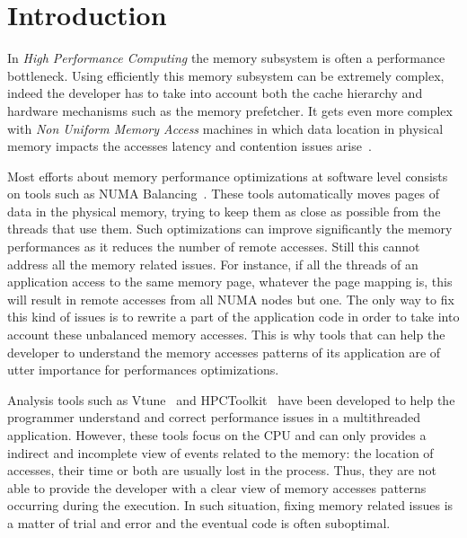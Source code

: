 \section{Introduction}
\label{sec:intro}

In \emph{High Performance Computing} the memory subsystem is often a performance bottleneck.
Using efficiently this memory subsystem can be extremely
complex, indeed the developer has to take into account both the cache hierarchy and
hardware mechanisms such as the memory prefetcher. It gets even more complex with
\emph{Non Uniform Memory Access} machines in which data location in
physical memory impacts the accesses latency and contention issues arise~\cite{Drepper07What}.

Most efforts about memory performance optimizations at software level consists
on tools such as NUMA Balancing~\cite{Corbet2012}.
These tools automatically moves pages of data in the physical memory, trying
to keep them as close as possible from the threads that use them. Such
optimizations can improve significantly the memory performances as it reduces
the number of remote accesses. Still this cannot address all the memory related issues. For instance, if all the
threads of an application access to the same memory page, whatever the page mapping is,
this will result in remote accesses from all NUMA nodes but one. The only way to fix
this kind of issues is to rewrite a part of the application code in order to take into account these
unbalanced memory accesses. This is why tools that can help the developer to understand the memory accesses patterns
of its application are of utter importance for performances optimizations.

Analysis tools such as Vtune~\cite{Reinders05VTune} and
HPCToolkit~\cite{Adhianto10HPCTOOLKIT} have been developed to help the programmer
understand and correct performance issues in a multithreaded application. However, these tools
focus on the CPU and can only provides a indirect and incomplete view of events related to the memory: the location of accesses,
their time or both are usually lost in the process. Thus, they are not able to provide the developer with
a clear view of memory accesses patterns occurring during the execution. In such situation, fixing
memory related issues is a matter of trial and error and the eventual code is often suboptimal.


